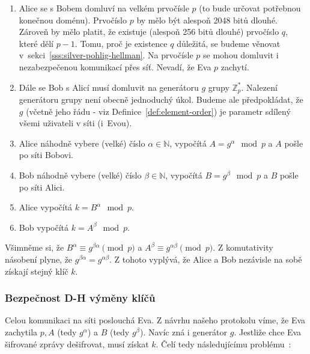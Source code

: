 \documentclass[
  program=infoi,
  biblatex=false,
  figures=true,
  glossaries,
  tables=false,
  sourcecodes=true,
  index
]{kidiplom}
\begin{document}
        \begin{enumerate}
            \item
                Alice se s Bobem domluví na velkém prvočísle $p$ (to bude určovat potřebnou konečnou doménu).
                Prvočíslo $p$ by mělo být alespoň 2048 bitů dlouhé.
                Zároveň by mělo platit, že existuje (alespoň 256 bitů dlouhé) prvočíslo $q$, které dělí $p-1$.
                Tomu, proč je existence $q$ důležitá, se budeme věnovat v~sekci~\ref{sss:silver-pohlig-hellman}.
                Na prvočísle $p$ se mohou domluvit i nezabezpečenou komunikací přes síť.
                Nevadí, že Eva $p$ zachytí.
            \item
                Dále se Bob s Alicí musí domluvit na generátoru $g$ grupy $\mathbb{Z}^*_p$.
                Nalezení generátoru grupy není obecně jednoduchý úkol.
                Budeme ale předpokládat, že $g$ (včetně jeho řádu - viz Definice~\ref{def:element-order})
                je parametr sdílený všemi uživateli v síti (i~Evou).
            \item
                Alice náhodně vybere (velké) číslo $\alpha \in \mathbb{N}$, vypočítá $A=g^\alpha \mod{p}$ a $A$ pošle po síti Bobovi.
            \item
                Bob náhodně vybere (velké) číslo $\beta \in \mathbb{N}$, vypočítá $B=g^\beta \mod{p}$ a $B$ pošle po síti Alici.
            \item
                Alice vypočítá $k=B^\alpha \mod{p}$.
            \item
                Bob vypočítá $k=A^\beta \mod{p}$.

        \end{enumerate}

        Všimněme si, že $B^\alpha \equiv g^{\beta \alpha} \pmod{p}$ a $A^\beta \equiv g^{\alpha \beta} \pmod{p}$. Z komutativity násobení
        plyne, že $g^{\beta \alpha} = g^{\alpha \beta}$. Z tohoto vyplývá, že Alice a Bob nezávisle na sobě získají stejný klíč $k$.


    \subsubsection{Bezpečnost D-H výměny klíčů}\label{ss:d-h-security}

        Celou komunikaci na síti poslouchá Eva.
        Z návrhu našeho protokolu víme, že Eva zachytila $p, A$ (tedy $g^\alpha$) a $B$ (tedy $g^\beta$).
        Navíc zná i generátor $g$.
        Jestliže chce Eva šifrované zprávy dešifrovat, musí získat $k$.
        Čelí tedy následujícímu problému~\cite{rsa-and-public}:
\end{document}
